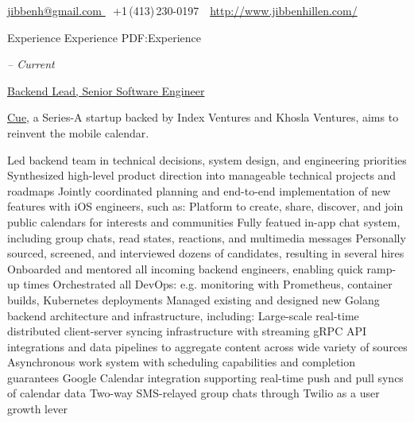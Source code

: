 \documentclass[letterpaper,nonstopmode]{simpleresumecv}
\newcommand{\CVAuthor}{Jibben Hillen}
\newcommand{\CVWebpage}{http://www.jibbenhillen.com/}
\begin{document}

\Title{\CVAuthor}

\begin{SubTitle}
\href{mailto:jibbenh@gmail.com}
{jibbenh@gmail.com }
\,\SubBulletSymbol\,
+1\,(413)\,230-0197
\,\SubBulletSymbol\,
\href{\CVWebpage}
{\url{\CVWebpage}}
\end{SubTitle}

\begin{Body}
\thispagestyle{empty}


\Section
{Experience}
{Experience}
{PDF:Experience}

\Entry
{}
\hfill \textit{ -- Current}
\SmallGap
\begin{Position}\underline{Backend Lead, Senior Software Engineer}\end{Position}
\Gap
\begin{Detail} \href{https://www.cue.app}{Cue}, a Series-A startup backed by Index Ventures and Khosla Ventures, aims to reinvent the mobile calendar.
\end{Detail}
\SmallGap
\BulletItem Led backend team in technical decisions, system design, and engineering priorities
\BulletItem Synthesized high-level product direction into manageable technical projects and roadmaps
\BulletItem Jointly coordinated planning and end-to-end implementation of new features with iOS engineers, such as:
\SubBulletItem Platform to create, share, discover, and join public calendars for interests and communities
\SubBulletItem Fully featued in-app chat system, including group chats, read states, reactions, and multimedia messages
\BulletItem Personally sourced, screened, and interviewed dozens of candidates, resulting in several hires
\BulletItem Onboarded and mentored all incoming backend engineers, enabling quick ramp-up times
\BulletItem Orchestrated all DevOps: e.g. monitoring with Prometheus, container builds, Kubernetes deployments
\BulletItem Managed existing and designed new Golang backend architecture and infrastructure, including:
\SubBulletItem Large-scale real-time distributed client-server syncing infrastructure with streaming gRPC
\SubBulletItem API integrations and data pipelines to aggregate content across wide variety of sources
\SubBulletItem Asynchronous work system with scheduling capabilities and completion guarantees
\SubBulletItem Google Calendar integration supporting real-time push and pull syncs of calendar data
\SubBulletItem Two-way SMS-relayed group chats through Twilio as a user growth lever
\BigGap


\end{Body}
\end{document}
